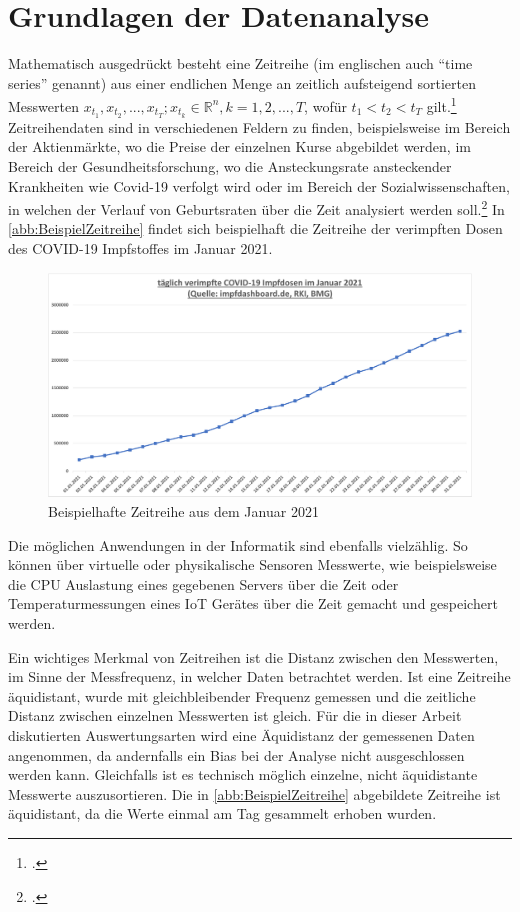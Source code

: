 \section{Grundlagen der Datenanalyse}

Mathematisch ausgedrückt besteht eine Zeitreihe (im englischen auch \enquote{time series} genannt) aus einer endlichen Menge an zeitlich aufsteigend sortierten Messwerten $x_{t_1},x_{t_2},...,x_{t_T};  x_{t_k} \in \mathbb{R}^n, k=1,2,...,T$, wofür $t_1 < t_2 < t_T $ gilt.\footcite[Vgl.][1]{Deistler.2018b} Zeitreihendaten sind in verschiedenen Feldern zu finden, beispielsweise im Bereich der Aktienmärkte, wo die Preise der einzelnen Kurse abgebildet werden, im Bereich der Gesundheitsforschung, wo die Ansteckungsrate ansteckender Krankheiten wie Covid-19 verfolgt wird oder im Bereich der Sozialwissenschaften, in welchen der Verlauf von Geburtsraten über die Zeit analysiert werden soll.\footcite[Vgl.][1]{Shumway.2017b} In \autoref{abb:BeispielZeitreihe} findet sich beispielhaft die Zeitreihe der verimpften Dosen des COVID-19 Impfstoffes im Januar 2021.

\begin{figure}[H]
\centering
\includegraphics[width=\textwidth]{graphics/Beispiel-Zeitreihe.pdf}
\caption{Beispielhafte Zeitreihe aus dem Januar 2021}
\label{abb:BeispielZeitreihe}
\end{figure}

Die möglichen Anwendungen in der Informatik sind ebenfalls vielzählig. So können über virtuelle oder physikalische Sensoren Messwerte, wie beispielsweise die CPU Auslastung eines gegebenen Servers über die Zeit oder Temperaturmessungen eines \ac{IoT} Gerätes über die Zeit gemacht und gespeichert werden.

Ein wichtiges Merkmal von Zeitreihen ist die Distanz zwischen den Messwerten, im Sinne der Messfrequenz, in welcher Daten betrachtet werden.  Ist eine Zeitreihe äquidistant, wurde mit gleichbleibender Frequenz gemessen und die zeitliche Distanz zwischen einzelnen Messwerten ist gleich. Für die in dieser Arbeit diskutierten Auswertungsarten wird eine Äquidistanz der gemessenen Daten angenommen, da andernfalls ein Bias bei der Analyse nicht ausgeschlossen werden kann. Gleichfalls ist es technisch möglich einzelne, nicht äquidistante Messwerte auszusortieren. Die in \autoref{abb:BeispielZeitreihe} abgebildete Zeitreihe ist äquidistant, da die Werte einmal am Tag gesammelt erhoben wurden.


